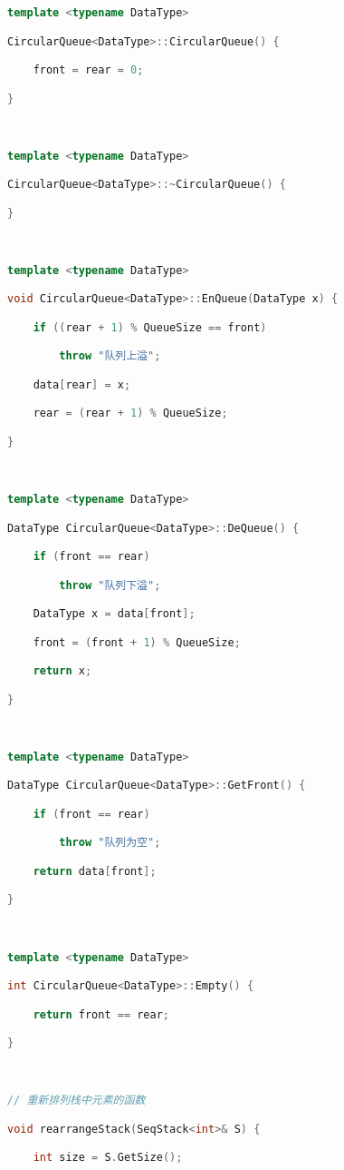 \begin{lstlisting}[language=C++]
template <typename DataType>

CircularQueue<DataType>::CircularQueue() {

    front = rear = 0;

}

  

template <typename DataType>

CircularQueue<DataType>::~CircularQueue() {

}

  

template <typename DataType>

void CircularQueue<DataType>::EnQueue(DataType x) {

    if ((rear + 1) % QueueSize == front)

        throw "队列上溢";

    data[rear] = x;

    rear = (rear + 1) % QueueSize;

}

  

template <typename DataType>

DataType CircularQueue<DataType>::DeQueue() {

    if (front == rear)

        throw "队列下溢";

    DataType x = data[front];

    front = (front + 1) % QueueSize;

    return x;

}

  

template <typename DataType>

DataType CircularQueue<DataType>::GetFront() {

    if (front == rear)

        throw "队列为空";

    return data[front];

}

  

template <typename DataType>

int CircularQueue<DataType>::Empty() {

    return front == rear;

}

  

// 重新排列栈中元素的函数

void rearrangeStack(SeqStack<int>& S) {

    int size = S.GetSize();


\end{lstlisting}
